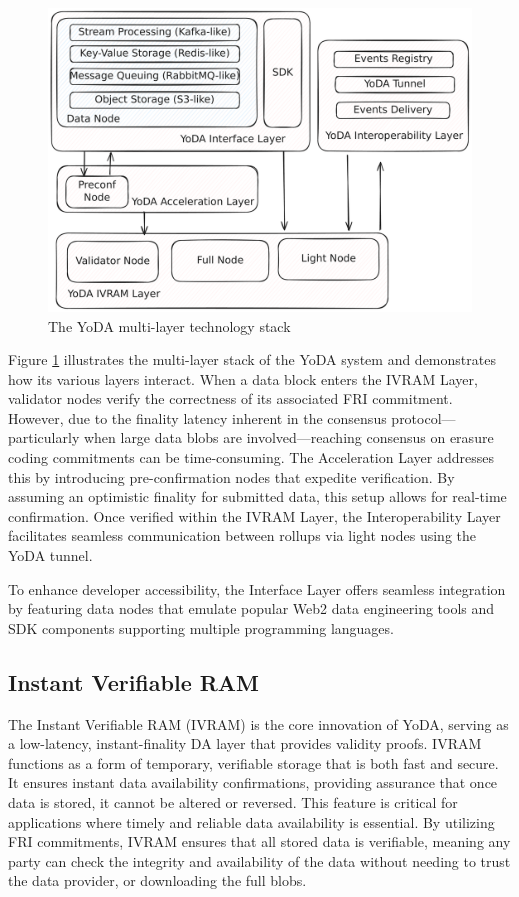 \documentclass[11pt]{article}
\begin{document}
\begin{figure}[htp]
    \centering
    \includegraphics[scale=0.2]{images/yoda-arch.pdf}
    \caption{The YoDA multi-layer technology stack}
    \label{fig:yoda-arch}
\end{figure}

Figure \ref{fig:yoda-arch} illustrates the multi-layer stack of the YoDA system and demonstrates how its various layers interact. When a data block enters the IVRAM Layer, validator nodes verify the correctness of its associated FRI commitment. However, due to the finality latency inherent in the consensus protocol—particularly when large data blobs are involved—reaching consensus on erasure coding commitments can be time-consuming. The Acceleration Layer addresses this by introducing pre-confirmation nodes that expedite verification. By assuming an optimistic finality for submitted data, this setup allows for real-time confirmation. Once verified within the IVRAM Layer, the Interoperability Layer facilitates seamless communication between rollups via light nodes using the YoDA tunnel.

To enhance developer accessibility, the Interface Layer offers seamless integration by featuring data nodes that emulate popular Web2 data engineering tools and SDK components supporting multiple programming languages.

\subsection{Instant Verifiable RAM}
The Instant Verifiable RAM (IVRAM) is the core innovation of YoDA, serving as a low-latency, instant-finality DA layer that provides validity proofs. IVRAM functions as a form of temporary, verifiable storage that is both fast and secure. It ensures instant data availability confirmations, providing assurance that once data is stored, it cannot be altered or reversed. This feature is critical for applications where timely and reliable data availability is essential. By utilizing FRI commitments, IVRAM ensures that all stored data is verifiable, meaning any party can check the integrity and availability of the data without needing to trust the data provider, or downloading the full blobs.
\end{document}
